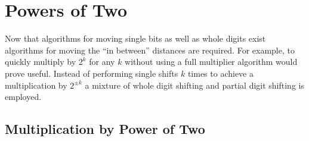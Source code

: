 \documentclass[b5paper]{book}
\begin{document}
\section{Powers of Two}

Now that algorithms for moving single bits as well as whole digits exist algorithms for moving the ``in between'' distances are required.  For 
example, to quickly multiply by $2^k$ for any $k$ without using a full multiplier algorithm would prove useful.  Instead of performing single
shifts $k$ times to achieve a multiplication by $2^{\pm k}$ a mixture of whole digit shifting and partial digit shifting is employed.  

\subsection{Multiplication by Power of Two}
\end{document}
